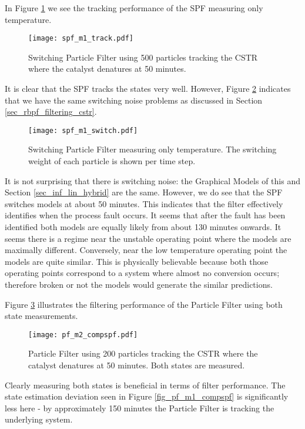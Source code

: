 In Figure \ref{fig_spf_m1_track} we see the tracking performance of the SPF measuring only temperature.
\begin{figure}[H] 
\centering
\texttt{[image: spf\_m1\_track.pdf]}
\caption{Switching Particle Filter using 500 particles tracking the CSTR where the catalyst denatures at 50 minutes.}
\label{fig_spf_m1_track}
\end{figure}
It is clear that the SPF tracks the states very well. However, Figure \ref{fig_spf_m1_switch} indicates that we have the same switching noise problems as discussed in Section \ref{sec_rbpf_filtering_cstr}.
\begin{figure}[H] 
\centering
\texttt{[image: spf\_m1\_switch.pdf]}
\caption{Switching Particle Filter measuring only temperature. The switching weight of each particle is shown per time step.}
\label{fig_spf_m1_switch}
\end{figure} 
It is not surprising that there is switching noise: the Graphical Models of this and Section \ref{sec_inf_lin_hybrid} are the same. However, we do see that the SPF switches models at about 50 minutes. This indicates that the filter effectively identifies when the process fault occurs. It seems that after the fault has been identified both models are equally likely from about 130 minutes onwards. It seems there is a regime near the unstable operating point where the models are maximally different. Conversely, near the low temperature operating point the models are quite similar. This is physically believable because both those operating points correspond to a system where almost no conversion occurs; therefore broken or not the models would generate the similar predictions.

Figure \ref{fig_pf_m2_compspf} illustrates the filtering performance of the Particle Filter using both state measurements.
\begin{figure}[H] 
\centering
\texttt{[image: pf\_m2\_compspf.pdf]}
\caption{Particle Filter using 200 particles tracking the CSTR where the catalyst denatures at 50 minutes. Both states are measured.}
\label{fig_pf_m2_compspf}
\end{figure}
Clearly measuring both states is beneficial in terms of filter performance. The state estimation deviation seen in Figure \ref{fig_pf_m1_compspf} is significantly less here - by approximately 150 minutes the Particle Filter is tracking the underlying system.

